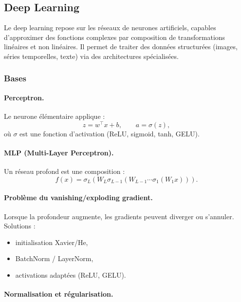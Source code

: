 \documentclass[11pt,a4paper]{article}
\newcommand{\1}{\mathbf{1}}
\begin{document}
\subsection{Deep Learning}

Le deep learning repose sur les réseaux de neurones artificiels, capables
d'approximer des fonctions complexes par composition de transformations
linéaires et non linéaires. Il permet de traiter des données structurées
(images, séries temporelles, texte) via des architectures spécialisées.

\subsubsection{Bases}

\paragraph{Perceptron.}

Le neurone élémentaire applique :
\[
z = w^\top x + b,
\qquad
a = \sigma(z),
\]
où $\sigma$ est une fonction d'activation (ReLU, sigmoid, tanh, GELU).

\paragraph{MLP (Multi-Layer Perceptron).}

Un réseau profond est une composition :
\[
f(x) = \sigma_L(W_L \sigma_{L-1}(W_{L-1}\cdots \sigma_1(W_1 x))).
\]

\paragraph{Problème du vanishing/exploding gradient.}

Lorsque la profondeur augmente, les gradients peuvent diverger ou s'annuler.
Solutions :
\begin{itemize}
  \item initialisation Xavier/He,
  \item BatchNorm / LayerNorm,
  \item activations adaptées (ReLU, GELU).
\end{itemize}

\paragraph{Normalisation et régularisation.}
\end{document}
